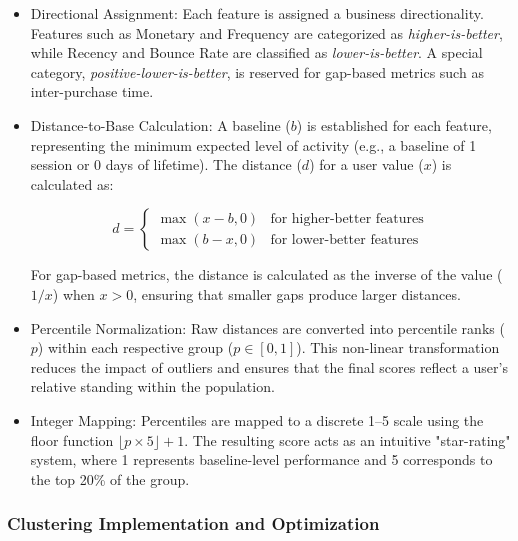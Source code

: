 \documentclass[conference]{IEEEtran}
\begin{document}
\begin{itemize}

\item Directional Assignment: Each feature is assigned
a business directionality. Features such as Monetary and
Frequency are categorized as \textit{higher-is-better},
while Recency and Bounce Rate are classified as
\textit{lower-is-better}. A special category,
\textit{positive-lower-is-better}, is reserved for
gap-based metrics such as inter-purchase time.

\item Distance-to-Base Calculation: A baseline ($b$)
is established for each feature, representing the minimum
expected level of activity (e.g., a baseline of 1 session
or 0 days of lifetime). The distance ($d$) for a user value
($x$) is calculated as:

\begin{equation}
d =
\begin{cases}
\max(x - b, 0)
& \text{for higher-better features} \\

\max(b - x, 0)
& \text{for lower-better features}
\end{cases}
\end{equation}

For gap-based metrics, the distance is calculated as the
inverse of the value ($1/x$) when $x > 0$, ensuring that
smaller gaps produce larger distances.

\item Percentile Normalization: Raw distances are
converted into percentile ranks ($p$) within each respective
group ($p \in [0,1]$). This non-linear transformation
reduces the impact of outliers and ensures that the final
scores reflect a user's relative standing within the
population.

\item Integer Mapping: Percentiles are mapped to a
discrete 1--5 scale using the floor function
$\lfloor p \times 5 \rfloor + 1$. The resulting score acts
as an intuitive "star-rating" system, where 1 represents
baseline-level performance and 5 corresponds to the top
20\% of the group.

\end{itemize}

\subsubsection{Clustering Implementation and Optimization}
\end{document}

